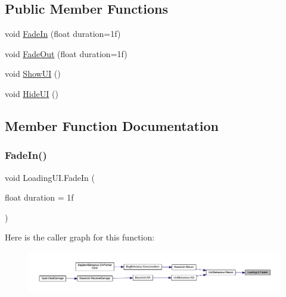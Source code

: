 \subsection*{Public Member Functions}
\begin{DoxyCompactItemize}
\item 
void \mbox{\hyperlink{class_loading_u_i_ada368f60f70e94bc04f0cbf47455306a}{Fade\+In}} (float duration=1f)
\item 
void \mbox{\hyperlink{class_loading_u_i_adaafb58a5d49b940e039bd307a67b2c9}{Fade\+Out}} (float duration=1f)
\item 
void \mbox{\hyperlink{class_loading_u_i_a117b66becd8ec50738d5bb53395c5638}{Show\+UI}} ()
\item 
void \mbox{\hyperlink{class_loading_u_i_a4b195dd7d9b45cbe16506f67e2d8bf10}{Hide\+UI}} ()
\end{DoxyCompactItemize}


\subsection{Member Function Documentation}
\mbox{\label{class_loading_u_i_ada368f60f70e94bc04f0cbf47455306a}} 
\subsubsection{\texorpdfstring{FadeIn()}{FadeIn()}}
{\footnotesize\ttfamily void Loading\+U\+I.\+Fade\+In (\begin{DoxyParamCaption}\item[{float}]{duration = {\ttfamily 1f} }\end{DoxyParamCaption})}

Here is the caller graph for this function\+:\nopagebreak
\begin{figure}[H]
\begin{center}
\leavevmode
\includegraphics[width=350pt]{class_loading_u_i_ada368f60f70e94bc04f0cbf47455306a_icgraph}
\end{center}
\end{figure}
\mbox{\label{class_loading_u_i_adaafb58a5d49b940e039bd307a67b2c9}} 
